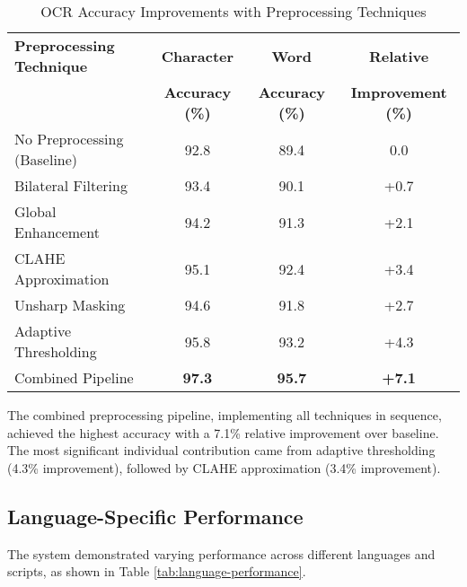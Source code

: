 \begin{table}[h!]
\centering
\caption{OCR Accuracy Improvements with Preprocessing Techniques}
\label{tab:preprocessing-impact}
\begin{tabular}{|l|c|c|c|}
\hline
\textbf{Preprocessing Technique} & \textbf{Character} & \textbf{Word} & \textbf{Relative} \\
                                 & \textbf{Accuracy (\%)} & \textbf{Accuracy (\%)} & \textbf{Improvement (\%)} \\
\hline
No Preprocessing (Baseline) & 92.8 & 89.4 & 0.0 \\
Bilateral Filtering & 93.4 & 90.1 & +0.7 \\
Global Enhancement & 94.2 & 91.3 & +2.1 \\
CLAHE Approximation & 95.1 & 92.4 & +3.4 \\
Unsharp Masking & 94.6 & 91.8 & +2.7 \\
Adaptive Thresholding & 95.8 & 93.2 & +4.3 \\
Combined Pipeline & \textbf{97.3} & \textbf{95.7} & \textbf{+7.1} \\
\hline
\end{tabular}
\end{table}

The combined preprocessing pipeline, implementing all techniques in sequence, achieved the highest accuracy with a 7.1\% relative improvement over baseline. The most significant individual contribution came from adaptive thresholding (4.3\% improvement), followed by CLAHE approximation (3.4\% improvement).

\subsection{Language-Specific Performance}

The system demonstrated varying performance across different languages and scripts, as shown in Table \ref{tab:language-performance}.

\begin{table}[h!]
\centering
\caption{OCR Performance Across Different Languages and Scripts}
\label{tab:language-performance}
\end{table}

